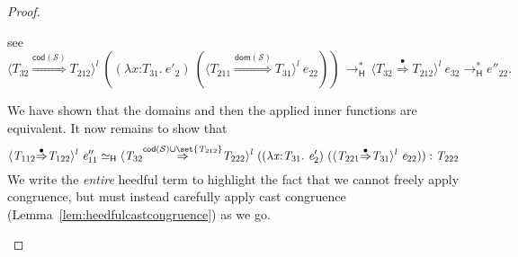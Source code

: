 \documentclass[9pt]{extarticle}
\newcommand{\ottnt}[1]{\mathit{#1}}
\begin{document}
{\begin{lemma}
\begin{proof}
{\begin{itemize}
\begin{itemize}
        see \[  \langle  \ottnt{T_{{\mathrm{32}}}}  \mathord{ \overset{  \mathsf{cod} ( \mathcal{S} )  }{\Rightarrow} }  \ottnt{T_{{\mathrm{212}}}}  \rangle^{ \ottnt{l} } ~   (   (  \lambda \mathit{x} \mathord{:} \ottnt{T_{{\mathrm{31}}}} .~  \ottnt{e'_{{\mathrm{2}}}}  )  ~  (  \langle  \ottnt{T_{{\mathrm{211}}}}  \mathord{ \overset{  \mathsf{dom} ( \mathcal{S} )  }{\Rightarrow} }  \ottnt{T_{{\mathrm{31}}}}  \rangle^{ \ottnt{l} } ~  \ottnt{e_{{\mathrm{22}}}}  )   )   \,  \longrightarrow ^{*}_{  \mathsf{H}  }  \,  \langle  \ottnt{T_{{\mathrm{32}}}}  \mathord{ \overset{\bullet}{\Rightarrow} }  \ottnt{T_{{\mathrm{212}}}}  \rangle^{ \ottnt{l} } ~  \ottnt{e_{{\mathrm{32}}}}   \longrightarrow ^{*}_{  \mathsf{H}  }  \ottnt{e''_{{\mathrm{22}}}}. \]

        We have shown that the domains and then the applied inner
        functions are equivalent.  It now remains to show that
\[   \langle  \ottnt{T_{{\mathrm{112}}}}  \mathord{ \overset{\bullet}{\Rightarrow} }  \ottnt{T_{{\mathrm{122}}}}  \rangle^{ \ottnt{l} } ~  \ottnt{e''_{{\mathrm{11}}}}    \simeq _{  \mathsf{H}  }   \langle  \ottnt{T_{{\mathrm{32}}}}  \mathord{ \overset{   \mathsf{cod} ( \mathcal{S} )   \cup   \set{  \ottnt{T_{{\mathrm{212}}}}  }   }{\Rightarrow} }  \ottnt{T_{{\mathrm{222}}}}  \rangle^{ \ottnt{l} } ~   (   (  \lambda \mathit{x} \mathord{:} \ottnt{T_{{\mathrm{31}}}} .~  \ottnt{e'_{{\mathrm{2}}}}  )  ~  (  \langle  \ottnt{T_{{\mathrm{221}}}}  \mathord{ \overset{\bullet}{\Rightarrow} }  \ottnt{T_{{\mathrm{31}}}}  \rangle^{ \ottnt{l} } ~  \ottnt{e_{{\mathrm{22}}}}  )   )    :  \ottnt{T_{{\mathrm{222}}}}  \]
We write the \textit{entire} heedful term to highlight the
        fact that we cannot freely apply congruence, but must instead
        carefully apply cast congruence
        (Lemma~\ref{lem:heedfulcastcongruence}) as we go.
        

\end{itemize}
\end{itemize}}
\end{proof}
\end{lemma}}
\end{document}
